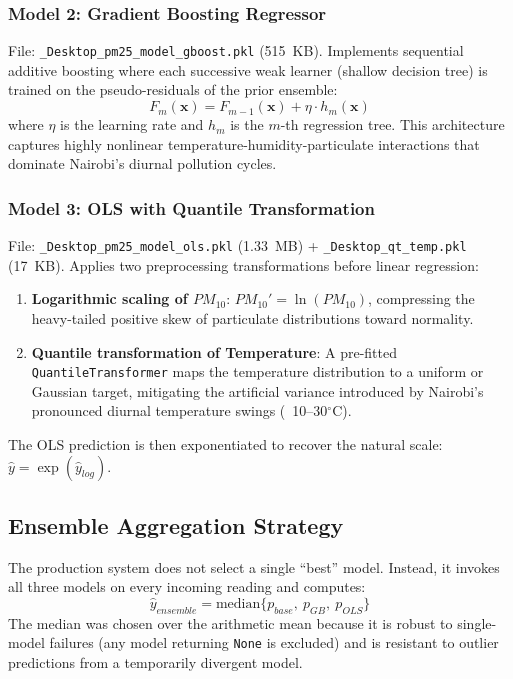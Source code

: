 \subsubsection{Model 2: Gradient Boosting Regressor}
File: \texttt{\_Desktop\_pm25\_model\_gboost.pkl} (515~KB). Implements sequential additive boosting where each successive weak learner (shallow decision tree) is trained on the pseudo-residuals of the prior ensemble:
\begin{equation}
    F_m(\mathbf{x}) = F_{m-1}(\mathbf{x}) + \eta \cdot h_m(\mathbf{x})
\end{equation}
where $\eta$ is the learning rate and $h_m$ is the $m$-th regression tree. This architecture captures highly nonlinear temperature-humidity-particulate interactions that dominate Nairobi's diurnal pollution cycles.

\subsubsection{Model 3: OLS with Quantile Transformation}
File: \texttt{\_Desktop\_pm25\_model\_ols.pkl} (1.33~MB) + \texttt{\_Desktop\_qt\_temp.pkl} (17~KB). Applies two preprocessing transformations before linear regression:
\begin{enumerate}[nosep]
    \item \textbf{Logarithmic scaling of $PM_{10}$}: $PM_{10}' = \ln(PM_{10})$, compressing the heavy-tailed positive skew of particulate distributions toward normality.
    \item \textbf{Quantile transformation of Temperature}: A pre-fitted \texttt{QuantileTransformer} maps the temperature distribution to a uniform or Gaussian target, mitigating the artificial variance introduced by Nairobi's pronounced diurnal temperature swings (~10--30$^\circ$C).
\end{enumerate}
The OLS prediction is then exponentiated to recover the natural scale: $\hat{y} = \exp(\hat{y}_{log})$.

\subsection{Ensemble Aggregation Strategy}
The production system does not select a single ``best'' model. Instead, it invokes all three models on every incoming reading and computes:
\begin{equation}
    \hat{y}_{ensemble} = \mathrm{median}\{p_{base},\ p_{GB},\ p_{OLS}\}
\end{equation}
The median was chosen over the arithmetic mean because it is robust to single-model failures (any model returning \texttt{None} is excluded) and is resistant to outlier predictions from a temporarily divergent model.

